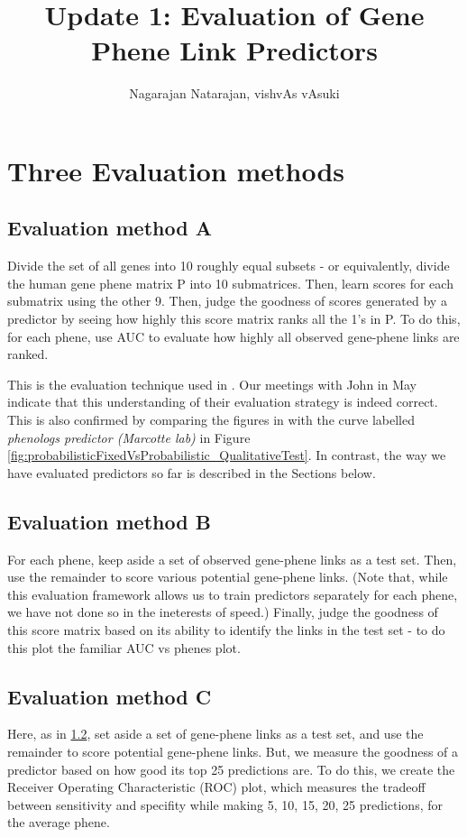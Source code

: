 \documentclass{article}
\title{Update 1: Evaluation of Gene Phene Link Predictors}
\author{Nagarajan Natarajan, vishvAs vAsuki}
\begin{document}
\maketitle
\tableofcontents

\section{Three Evaluation methods}
\label{sec:Three Evaluation methods}
\subsection{Evaluation method A}
Divide the set of all genes into 10 roughly equal subsets - or equivalently, divide the human gene phene matrix P into 10 submatrices. Then, learn scores for each submatrix using the other 9. Then, judge the goodness of scores generated by a predictor by seeing how highly this score matrix ranks all the 1's in P. To do this, for each phene, use AUC to evaluate how highly all observed gene-phene links are ranked.

This is the evaluation technique used in \cite{McGaryOrthologousPhenotypes}. Our meetings with John in May indicate that this understanding of their evaluation strategy is indeed correct. This is also confirmed by comparing the figures in \cite{McGaryOrthologousPhenotypes} with the  curve labelled \textit{phenologs predictor (Marcotte lab)} in Figure \ref{fig:probabilisticFixedVsProbabilistic_QualitativeTest}. In contrast, the way we have evaluated predictors so far is described in the Sections below.

\subsection{Evaluation method B}
\label{sec:Evaluation method B}
For each phene, keep aside a set of observed gene-phene links as a test set. Then, use the remainder to score various potential gene-phene links. (Note that, while this evaluation framework allows us to train predictors separately for each phene, we have not done so in the ineterests of speed.) Finally, judge the goodness of this score matrix based on its ability to identify the links in the test set - to do this plot the familiar AUC vs phenes plot.

\subsection{Evaluation method C}
Here, as in \ref{sec:Evaluation method B}, set aside a set of gene-phene links as a test set, and use the remainder to score potential gene-phene links. But, we measure the goodness of a predictor based on how good its top 25 predictions are. To do this, we create the Receiver Operating Characteristic (ROC) plot, which measures the tradeoff between sensitivity and specifity while making 5, 10, 15, 20, 25 predictions, for the average phene.
\end{document}
